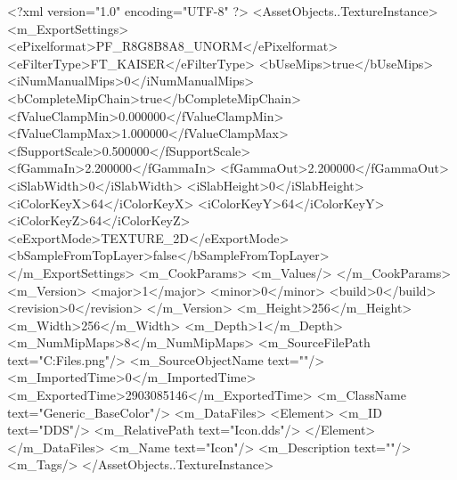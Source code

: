 <?xml version="1.0" encoding="UTF-8" ?>
<AssetObjects..TextureInstance>
	<m_ExportSettings>
		<ePixelformat>PF_R8G8B8A8_UNORM</ePixelformat>
		<eFilterType>FT_KAISER</eFilterType>
		<bUseMips>true</bUseMips>
		<iNumManualMips>0</iNumManualMips>
		<bCompleteMipChain>true</bCompleteMipChain>
		<fValueClampMin>0.000000</fValueClampMin>
		<fValueClampMax>1.000000</fValueClampMax>
		<fSupportScale>0.500000</fSupportScale>
		<fGammaIn>2.200000</fGammaIn>
		<fGammaOut>2.200000</fGammaOut>
		<iSlabWidth>0</iSlabWidth>
		<iSlabHeight>0</iSlabHeight>
		<iColorKeyX>64</iColorKeyX>
		<iColorKeyY>64</iColorKeyY>
		<iColorKeyZ>64</iColorKeyZ>
		<eExportMode>TEXTURE_2D</eExportMode>
		<bSampleFromTopLayer>false</bSampleFromTopLayer>
	</m_ExportSettings>
	<m_CookParams>
		<m_Values/>
	</m_CookParams>
	<m_Version>
		<major>1</major>
		<minor>0</minor>
		<build>0</build>
		<revision>0</revision>
	</m_Version>
	<m_Height>256</m_Height>
	<m_Width>256</m_Width>
	<m_Depth>1</m_Depth>
	<m_NumMipMaps>8</m_NumMipMaps>
	<m_SourceFilePath text="C:\Users\Shadow\Desktop\Working Files\Icon.png"/>
	<m_SourceObjectName text=""/>
	<m_ImportedTime>0</m_ImportedTime>
	<m_ExportedTime>2903085146</m_ExportedTime>
	<m_ClassName text="Generic_BaseColor"/>
	<m_DataFiles>
		<Element>
			<m_ID text="DDS"/>
			<m_RelativePath text="Icon.dds"/>
		</Element>
	</m_DataFiles>
	<m_Name text="Icon"/>
	<m_Description text=""/>
	<m_Tags/>
</AssetObjects..TextureInstance>

